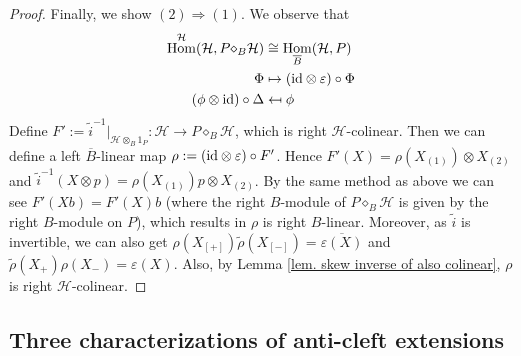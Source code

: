 \documentclass[a4paper,reqno]{amsart}
\DeclareMathOperator{\Hom}{Hom}
\newcommand*{\id}{\textup{id}}
\numberwithin{equation}{section}
\theoremstyle{plain}
\theoremstyle{remark}
\numberwithin{equation}{section}
\newcommand{\ot}{\otimes}
\newcommand{\BB}{\overline{B}}
\newcommand{\ti}{{\tilde{i}}}
\newcommand{\trho}{{\tilde{\rho}}}
\renewcommand{\o}{{}_{\scriptscriptstyle{(1)}}}
\renewcommand{\t}{{}_{\scriptscriptstyle{(2)}}}
\newcommand{\di}{{\diamond_{B}}}
\newcommand{\CH}{\mathcal{H}}
\begin{document}
\begin{proof}
Finally, we show $(2)\Rightarrow (1)$. We observe that 
\begin{align*}
    \Hom^{\CH}(\CH, P\di \CH)&\cong \Hom_{\BB}(\CH, P)\\
    \Phi&\mapsto (\id\ot\varepsilon)\circ \Phi\\
    (\phi\ot \id)\circ\Delta&\mapsfrom \phi
\end{align*}
Define $F':=\ti^{-1}|_{\CH\ot_{B}1_{P}}:\CH\to P\di\CH$, which is right $\CH$-colinear. Then we can define a left $\BB$-linear map  $\rho:=(\id\ot \varepsilon)\circ F'$. Hence $F'(X)=\rho(X\o)\ot X\t$ and $\ti^{-1}(X\ot p)=\rho(X\o)p\ot X\t$. By the same method as above we can see $F'(Xb)=F'(X)b$ (where the right $B$-module of $P\di\CH$ is given by the right $B$-module on $P$), which results in $\rho$ is right $B$-linear. Moreover, as $\ti$ is invertible, we can also get $\rho(X_{[+]})\trho(X_{[-]})=\overline{\varepsilon(X)}$ and $\trho(X_{+})\rho(X_{-})=\varepsilon(X)$. Also, by Lemma \ref{lem. skew inverse of also colinear}, $\rho$ is right $\CH$-colinear.
\end{proof}






\subsection{Three characterizations of anti-cleft extensions}
\end{document}
